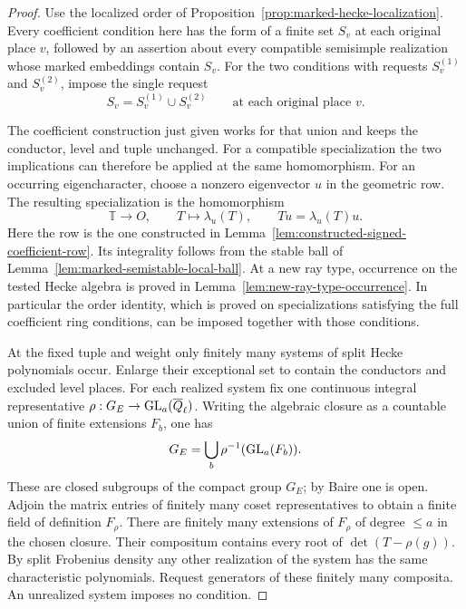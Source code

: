\begin{proof}
Use the localized order of Proposition~\ref{prop:marked-hecke-localization}.
Every coefficient condition here has the form of a finite set
\(S_v\) at each original place \(v\), followed by an assertion
about every compatible semisimple realization whose marked embeddings
contain \(S_v\). For the two conditions with requests \(S_v^{(1)}\) and \(S_v^{(2)}\), impose the single request
\[
 S_v=S_v^{(1)}\cup S_v^{(2)}\qquad\text{at each original place }v .
\]

The coefficient construction just given works for that union and
keeps the conductor, level and tuple unchanged. For a compatible specialization the two implications can therefore be applied at the same homomorphism. For an occurring eigencharacter, choose a nonzero eigenvector \(u\) in the geometric row. The resulting specialization is the homomorphism
\[
    \mathbb T\longrightarrow O,\qquad T\longmapsto\lambda_u(T),
                         \qquad Tu=\lambda_u(T)u .
\]
Here the row is the one constructed in Lemma~\ref{lem:constructed-signed-coefficient-row}. Its integrality follows from the stable ball of Lemma~\ref{lem:marked-semistable-local-ball}. At a new ray type, occurrence on the tested Hecke algebra is proved in Lemma~\ref{lem:new-ray-type-occurrence}. In particular the order identity,
which is proved on specializations satisfying the full coefficient
ring conditions, can be imposed together with those conditions.

At the fixed tuple and weight only finitely many systems of split
Hecke polynomials occur. Enlarge their exceptional set to contain
the conductors and excluded level places. For each realized system
fix one continuous integral representative
\(\rho:G_E\to{\rm GL}_a(\overline{\mathbb Q}_\ell)\).
Writing the algebraic closure as a countable union of finite
extensions \(F_b\), one has
\[
 G_E=\bigcup_b\rho^{-1}({\rm GL}_a(F_b)).
\]
These are closed subgroups of the compact group \(G_E\); by Baire
one is open. Adjoin the matrix entries of finitely many coset
representatives to obtain a finite field of definition \(F_\rho\).
There are finitely many extensions of \(F_\rho\) of degree
\(\le a\) in the chosen closure. Their compositum contains every
root of \(\det(T-\rho(g))\). By split Frobenius density any other
realization of the system has the same characteristic polynomials.
Request generators of these finitely many composita. An unrealized
system imposes no condition.


\end{proof}
